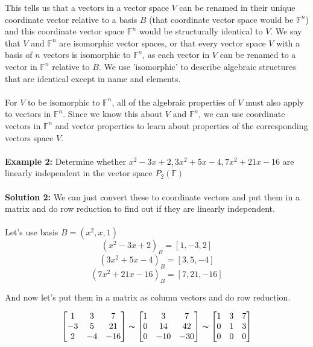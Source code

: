 \documentclass[12pt]{article}
\begin{document}
This tells us that a vectors in a vector space $V$ can be renamed in their unique coordinate vector relative to a basis $B$ (that coordinate vector space would be $\mathbb{F}^n$) and this coordinate vector space $\mathbb{F}^n$ would be structurally identical to $V$. We say that $V$ and $\mathbb{F}^n$ are isomorphic vector spaces, or that every vector space $V$ with a basis of $n$ vectors is isomorphic to $\mathbb{F}^n$, as each vector in $V$ can be renamed to a vector in $\mathbb{F}^n$ relative to $B$. We use 'isomorphic' to describe algebraic structures that are identical except in name and elements.\\
\\
For $V$ to be isomorphic to $\mathbb{F}^n$, all of the algebraic properties of $V$ must also apply to vectors in $\mathbb{F}^n$. Since we know this about $V$ and $\mathbb{F}^n$, we can use coordinate vectors in $\mathbb{F}^n$ and vector properties to learn about properties of the corresponding vectors space $V$.\\
\\
\textbf{Example 2:} Determine whether $x^2 - 3x + 2, 3x^2 + 5x - 4, 7x^2 + 21x - 16$ are linearly independent in the vector space $P_2 (\mathbb{F})$\\
\\
\textbf{Solution 2:} We can just convert these to coordinate vectors and put them in a matrix and do row reduction to find out if they are linearly independent.\\
\\
Let's use basis $B = (x^2, x, 1)$\\
$$(x^2 - 3x + 2)_B = [1,-3,2]$$
$$(3x^2 + 5x - 4)_B = [3,5,-4]$$
$$(7x^2 + 21x - 16)_B = [7,21,-16]$$

And now let's put them in a matrix as column vectors and do row reduction.

$$\begin{bmatrix} 
1 & 3 & 7\\
-3 & 5 & 21\\
2 & -4 & -16 
\end{bmatrix}
\thicksim
\begin{bmatrix} 
1 & 3 & 7\\
0 & 14 & 42\\
0 & -10 & -30 
\end{bmatrix}
\thicksim
\begin{bmatrix} 
1 & 3 & 7\\
0 & 1 & 3\\
0 & 0 & 0 
\end{bmatrix}$$
\end{document}
